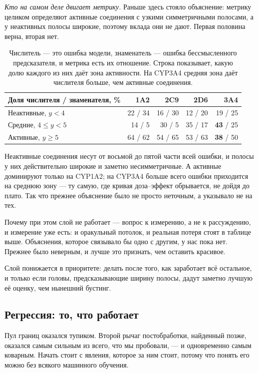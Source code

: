 \emph{Кто на самом деле двигает метрику.} Раньше здесь стояло объяснение: метрику целиком
определяют активные соединения с узкими симметричными полосами, а у неактивных полосы широкие,
поэтому вклада они не дают. Первая половина верна, вторая нет.

\begin{table}[htbp]\centering\small
\begin{tabularx}{\textwidth}{@{}Xrrrr@{}}
\toprule
Доля числителя / знаменателя, \% & 1A2 & 2C9 & 2D6 & 3A4 \\
\midrule
Неактивные, $y<4$        & 22 / 34 & 16 / 30 & 12 / 20 & 19 / 25 \\
Средние, $4\le y<5$      & 14 / \phantom{0}5 & 30 / \phantom{0}5 & 35 / 17 & \textbf{43} / 25 \\
Активные, $y\ge5$        & 64 / 62 & 54 / 65 & 53 / 63 & \textbf{38} / 50 \\
\bottomrule
\end{tabularx}
\caption{Числитель --- это ошибка модели, знаменатель --- ошибка бессмысленного предсказателя,
и метрика есть их отношение. Строка показывает, какую долю каждого из них даёт зона активности.
На CYP3A4 средняя зона даёт числителя больше, чем активные соединения.}
\label{tab:zones}
\end{table}

Неактивные соединения несут от восьмой до пятой части всей ошибки, и полосы у них
действительно широкие и заметно несимметричные. А активные доминируют только на CYP1A2; на
CYP3A4 больше всего ошибки приходится на среднюю зону --- ту самую, где кривая доза--эффект
обрывается, не дойдя до плато. Так что прежнее объяснение было не просто неточным, а
указывало не на тех.

Почему при этом слой не работает --- вопрос к измерению, а не к рассуждению, и измерение уже
есть: и оракульный потолок, и реальная потеря стоят в таблице выше. Объяснения, которое
связывало бы одно с другим, у нас пока нет. Прежнее было неверным, и лучше это признать, чем
оставить красивое.

Слой понижается в приоритете: делать после того, как заработает всё остальное, и только если
головы, предсказывающие ширину полосы, дадут заметно лучшую её оценку, чем нынешний бустинг.

\subsection{Регрессия: то, что работает}

Пул границ оказался тупиком. Второй рычаг постобработки, найденный позже, оказался самым
сильным из всего, что мы пробовали, --- и одновременно самым коварным. Начать стоит с
явления, которое за ним стоит, потому что понять его можно без всякого машинного обучения.

